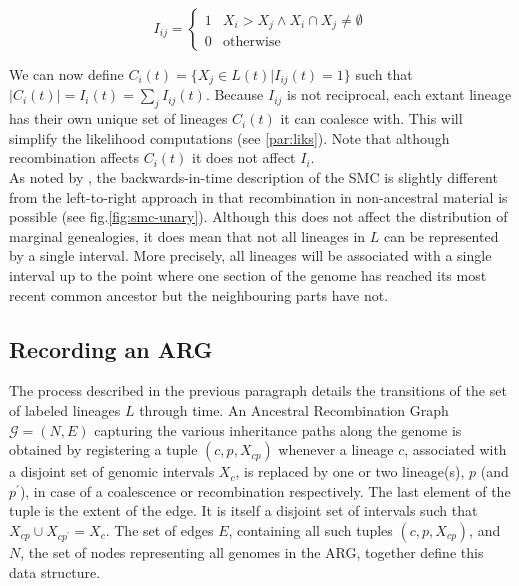 \documentclass{article}
\begin{document}
\begin{equation} \label{def:coal}
I_{ij} = \begin{cases}
1 & X_i > X_j \wedge X_i \cap X_j \neq \emptyset \\
0 & \text{otherwise}
\end{cases}
\end{equation}

We can now define $C_i(t) = \{X_j \in L(t) | I_{ij}(t) = 1\}$ such that $|C_i(t)| = 
I_{i}(t) = \sum_{j} I_{ij}(t)$.
Because $I_{ij}$ is not reciprocal, each extant lineage has their own unique set of 
lineages $C_i(t)$ it can coalesce with. This will simplify the likelihood computations 
(see \ref{par:liks}). Note that although recombination affects $C_i(t)$ it does not 
affect $I_{i}$.\\ 

As noted by \cite{mcvean_approximating_2005}, the backwards-in-time description of the 
SMC is slightly different from the left-to-right approach in that recombination 
in non-ancestral material is possible (see fig.\ref{fig:smc-unary}). 
Although this does not affect the distribution 
of marginal genealogies, it does mean that not all lineages in $L$ can be represented 
by a single interval. More precisely, all lineages will be associated with 
a single interval up to the point where one section of the 
genome has reached its most recent common ancestor but the neighbouring parts have not.

\subsection{Recording an ARG} \label{par:recording}

The process described in the previous paragraph details the transitions of the 
set of labeled lineages $L$ through time. An Ancestral Recombination Graph 
$\mathcal{G} = (N, E)$ capturing the various inheritance paths along the genome 
is obtained by registering a tuple $(c, p, X_{cp})$ whenever a 
lineage $c$, associated with a disjoint set of genomic intervals $X_c$, is 
replaced by one or two lineage(s), $p$ (and $p^{\prime}$), 
in case of a coalescence or recombination respectively.
The last element of the tuple is the extent of the edge. It is itself a  
disjoint set of intervals such that $X_{cp} \cup X_{cp^{\prime}} = X_c$. 
The set of edges $E$, containing all such tuples $(c, p, X_{cp})$, 
and $N$, the set of nodes representing all genomes in the ARG, together
define this data structure.\\
\end{document}
